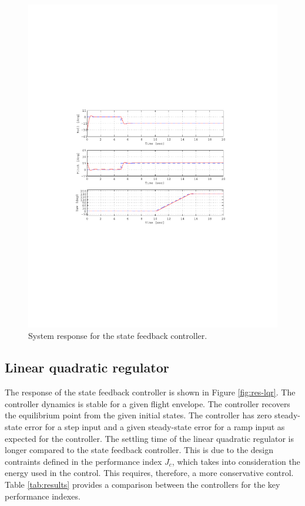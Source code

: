 \documentclass[12pt]{article}
\begin{document}
\begin{figure}[t]
  \centering
  \includegraphics{state-feedback.pdf}
  \caption{System response for the state feedback controller.}
  \label{fig:res-sf}
\end{figure}

\subsection{Linear quadratic regulator}

The response of the state feedback controller is shown in Figure \ref{fig:res-lqr}. The controller dynamics is stable for a given flight envelope. The controller recovers the equilibrium point from the given initial states. The controller has zero steady-state error for a step input and a given steady-state error for a ramp input as expected for the controller. The settling time of the linear quadratic regulator is longer compared to the state feedback controller. This is due to the design contraints defined in the performance index $J_c$, which takes into consideration the energy used in the control. This requires, therefore, a more conservative control. Table \ref{tab:results} provides a comparison between the controllers for the key performance indexes.
\end{document}
